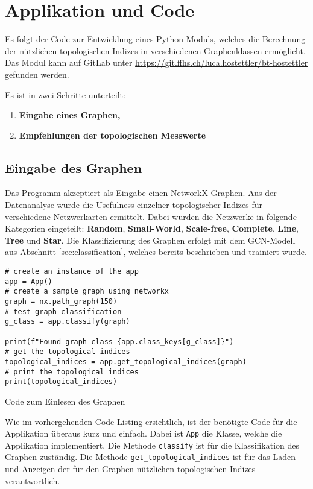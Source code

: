 \section{Applikation und Code}

Es folgt der Code zur Entwicklung eines Python-Moduls, welches die Berechnung der nützlichen topologischen Indizes in verschiedenen Graphenklassen ermöglicht.
Das Modul kann auf GitLab unter \url{https://git.ffhs.ch/luca.hostettler/bt-hostettler} gefunden werden.

Es ist in zwei Schritte unterteilt:
\begin{enumerate}[itemsep=0pt]
    \item \textbf{Eingabe eines Graphen,}
    \item \textbf{Empfehlungen der topologischen Messwerte}
\end{enumerate}

\subsection{Eingabe des Graphen}

Das Programm akzeptiert als Eingabe einen NetworkX-Graphen.
Aus der Datenanalyse wurde die Usefulness einzelner topologischer Indizes für verschiedene Netzwerkarten ermittelt. Dabei wurden die Netzwerke in folgende Kategorien eingeteilt: \textbf{Random}, \textbf{Small-World}, \textbf{Scale-free}, \textbf{Complete}, \textbf{Line}, \textbf{Tree} und \textbf{Star}. Die Klassifizierung des Graphen erfolgt mit dem GCN-Modell aus Abschnitt \ref{sec:classification}, welches bereits beschrieben und trainiert wurde.

\begin{listing}[H]
    \begin{verbatim}    
# create an instance of the app
app = App()
# create a sample graph using networkx
graph = nx.path_graph(150)
# test graph classification
g_class = app.classify(graph)

print(f"Found graph class {app.class_keys[g_class]}")
# get the topological indices
topological_indices = app.get_topological_indices(graph)
# print the topological indices
print(topological_indices)
    \end{verbatim}
    \caption{Code zum Einlesen des Graphen}
\end{listing}

Wie im vorhergehenden Code-Listing ersichtlich, ist der benötigte Code für die Applikation überaus kurz und einfach. Dabei ist \texttt{App} die Klasse, welche die Applikation implementiert. Die Methode \texttt{classify} ist für die Klassifikation des Graphen zuständig. Die Methode \texttt{get_topological_indices} ist für das Laden und Anzeigen der für den Graphen nützlichen topologischen Indizes verantwortlich.

